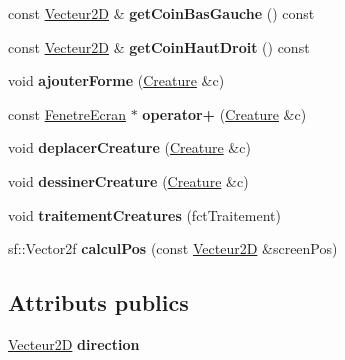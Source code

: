 \begin{DoxyCompactItemize}
const \mbox{\hyperlink{class_vecteur2_d}{Vecteur2D}} \& {\bfseries get\+Coin\+Bas\+Gauche} () const
\item 
\mbox{\label{class_fenetre_ecran_a3e19aa107adc34157e5220927232ca4c}} 
const \mbox{\hyperlink{class_vecteur2_d}{Vecteur2D}} \& {\bfseries get\+Coin\+Haut\+Droit} () const
\item 
\mbox{\label{class_fenetre_ecran_a5c5d369bfc2f4113ec98dc2cbed0976f}} 
void {\bfseries ajouter\+Forme} (\mbox{\hyperlink{class_creature}{Creature}} \&c)
\item 
\mbox{\label{class_fenetre_ecran_a0bb77db45c94f26297c75dcf193d5927}} 
const \mbox{\hyperlink{class_fenetre_ecran}{Fenetre\+Ecran}} $\ast$ {\bfseries operator+} (\mbox{\hyperlink{class_creature}{Creature}} \&c)
\item 
\mbox{\label{class_fenetre_ecran_a006f3f5939e13a380bd5f846cad68aa1}} 
void {\bfseries deplacer\+Creature} (\mbox{\hyperlink{class_creature}{Creature}} \&c)
\item 
\mbox{\label{class_fenetre_ecran_a05cc4075c331fa5ab72e169236066d67}} 
void {\bfseries dessiner\+Creature} (\mbox{\hyperlink{class_creature}{Creature}} \&c)
\item 
\mbox{\label{class_fenetre_ecran_a29848a04bd022b2baa8a3c3491b768ed}} 
void {\bfseries traitement\+Creatures} (fct\+Traitement)
\item 
\mbox{\label{class_fenetre_ecran_a2f4344b4bc71982db1c192ee45548aa1}} 
sf\+::\+Vector2f {\bfseries calcul\+Pos} (const \mbox{\hyperlink{class_vecteur2_d}{Vecteur2D}} \&screen\+Pos)
\end{DoxyCompactItemize}
\subsection*{Attributs publics}
\begin{DoxyCompactItemize}
\item 
\mbox{\label{class_fenetre_ecran_a6665b9f790eb76f887bd2850e2b1bed5}} 
\mbox{\hyperlink{class_vecteur2_d}{Vecteur2D}} {\bfseries direction}
\end{DoxyCompactItemize}
